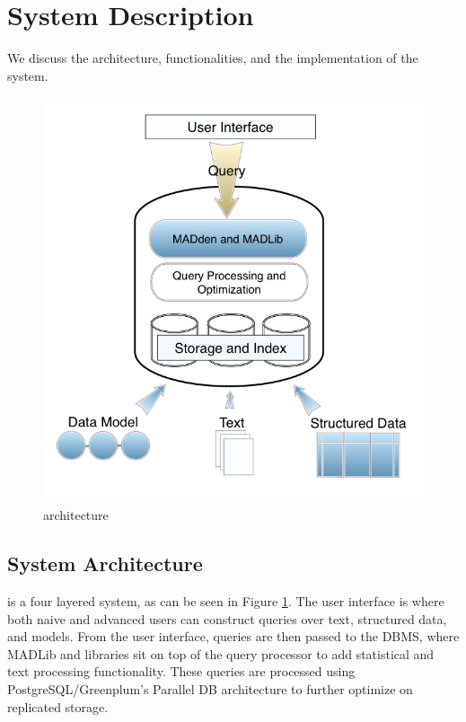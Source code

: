 
\section{System Description}

We discuss the architecture, functionalities, and the implementation of
the {\system} system.
\begin{figure}
   \begin{center}
        \includegraphics[scale=0.2]{content/graphics/arch.png}
        \caption{{\system} architecture}
        \label{fig:arch}
   \end{center}
\end{figure}
    
\subsection{System Architecture}

{\system} is a four layered system, as can be seen in Figure \ref{fig:arch}.
The user interface is where both naive and advanced users can construct queries over
text, structured data, and models. From the user interface, queries are then passed to the
DBMS, where MADLib and {\system} libraries sit on top of the query processor to
add statistical and text processing functionality. These queries are 
processed using PostgreSQL/Greenplum's Parallel DB architecture to further
optimize on replicated storage. 



